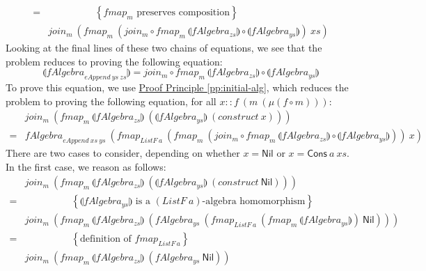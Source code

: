 \documentclass{jfp1}
\newcommand{\fold}[1]{\llparenthesis #1 \rrparenthesis}
\newcommand{\eqAnnotation}[1]{\hspace{2cm}\left\{\textrm{#1}\right\}}
\newcommand{\proofprinref}[1]{\hyperref[#1]{Proof Principle \ref*{#1}}}
\begin{document}
\begin{proof*}
\begin{displaymath}
\begin{array}{cl}
      =&\eqAnnotation{$\mathit{fmap_m}$ preserves composition} \\
      &\mathit{join_m}~(\mathit{fmap_m}~(\mathit{join_m} \circ \mathit{fmap}_m~\fold{\mathit{fAlgebra_{zs}}} \circ \fold{\mathit{fAlgebra_{ys}}})~\mathit{xs})
    \end{array}
  \end{displaymath}
  Looking at the final lines of these two chains of equations, we see
  that the problem reduces to proving the following equation:
  \begin{displaymath}
    \fold{\mathit{fAlgebra}_{\mathit{eAppend}~\mathit{ys}~\mathit{zs}}} = \mathit{join_m} \circ \mathit{fmap}_m~\fold{\mathit{fAlgebra_{zs}}} \circ \fold{\mathit{fAlgebra_{ys}}}
  \end{displaymath}
  To prove this equation, we use \proofprinref{pp:initial-alg}, which
  reduces the problem to proving the following equation, for all $x ::
  f~(m~(\mu(f \circ m)))$:
  \begin{displaymath}
    \begin{array}{cl}
      &\mathit{join_m}~(\mathit{fmap}_m~\fold{\mathit{fAlgebra_{zs}}}~(\fold{\mathit{fAlgebra_{ys}}}~(\mathit{construct}~x))) \\
      =& \mathit{fAlgebra}_{\mathit{eAppend}~\mathit{xs}~\mathit{ys}}~(\mathit{fmap}_{\mathit{ListF}~a}~(\mathit{fmap}_m~(\mathit{join_m} \circ \mathit{fmap}_m~\fold{\mathit{fAlgebra_{zs}}} \circ \fold{\mathit{fAlgebra_{ys}}}))~x)
    \end{array}
  \end{displaymath}
  There are two cases to consider, depending on whether $x =
  \mathsf{Nil}$ or $x = \mathsf{Cons}~a~\mathit{xs}$. In the first
  case, we reason as follows:
  \begin{displaymath}
    \begin{array}{cl}
      &\mathit{join_m}~(\mathit{fmap}_m~\fold{\mathit{fAlgebra_{zs}}}~(\fold{\mathit{fAlgebra_{ys}}}~(\mathit{construct}~\mathsf{Nil}))) \\
      =&\eqAnnotation{$\fold{\mathit{fAlgebra_{ys}}}$ is a $(\mathit{ListF}~a)$-algebra homomorphism} \\
      &\mathit{join_m}~(\mathit{fmap_m}~\fold{\mathit{fAlgebra_{zs}}}~(\mathit{fAlgebra_{ys}}~(\mathit{fmap}_{\mathit{ListF}~a}~(\mathit{fmap}_m~\fold{\mathit{fAlgebra_{ys}}})~\mathsf{Nil}))) \\
      =&\eqAnnotation{definition of $\mathit{fmap_{\mathit{ListF}~a}}$} \\
      &\mathit{join_m}~(\mathit{fmap_m}~\fold{\mathit{fAlgebra_{zs}}}~(\mathit{fAlgebra_{ys}}~\mathsf{Nil})) \\

\end{array}
\end{displaymath}
\end{proof*}
\end{document}
